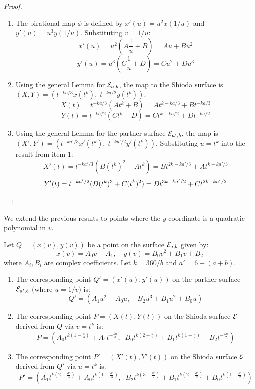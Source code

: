 \documentclass[11pt]{amsart}
\begin{document}
\begin{proof}
	\begin{enumerate}
	\item[(i)] The birational map $\phi$ is defined by $x'(u) = u^2 x(1/u)$ and $y'(u) = u^3 y(1/u)$. Substituting $v=1/u$:
	\[ x'(u) = u^2 \left( A \frac{1}{u} + B \right) = Au + Bu^2 \]
	\[ y'(u) = u^3 \left( C \frac{1}{u} + D \right) = Cu^2 + Du^3 \]
	
	\item[(ii)] Using the general Lemma for ${\mathcal E}_{a,b}$, the map to the Shioda surface is $(X, Y) = (t^{-ka/3}x(t^k), \; t^{-ka/2}y(t^k))$.
	\[ X(t) = t^{-ka/3} (A t^k + B) = A t^{k - ka/3} + B t^{-ka/3} \]
	\[ Y(t) = t^{-ka/2} (C t^k + D) = C t^{k - ka/2} + D t^{-ka/2} \]
	
\item[(iii)] Using the general Lemma for the partner surface ${\mathcal E}_{a',b}$, the map is $(X', Y') = (t^{-ka'/3}x'(t^k), \; t^{-ka'/2}y'(t^k))$.
	Substituting $u=t^k$ into the result from item 1:
	\[ X'(t) = t^{-ka'/3} (B (t^k)^2 + A t^k) = B t^{2k - ka'/3} + A t^{k - ka'/3} \]
	\[ Y'(t) = t^{-ka'/2} (D (t^k)^3 + C (t^k)^2) = D t^{3k - ka'/2} + C t^{2k - ka'/2} \qedhere \]
\end{enumerate}
\end{proof}

We extend the previous results to points where the $y$-coordinate is a quadratic polynomial in $v$.

\begin{lema}
	\label{lem:quadratic_transform}
	Let $Q = (x(v), y(v))$ be a point on the surface ${\mathcal E}_{a,b}$ given by:
	\[ x(v) = A_0 v + A_1, \quad y(v) = B_0 v^2 + B_1 v + B_2 \]
	where $A_i, B_i$ are complex coefficients. Let $k = 360/b$ and $a' = 6-(a+b)$.
	
	\begin{enumerate}
		\item[(i)] The corresponding point $Q'=(x'(u), y'(u))$ on the partner surface ${\mathcal E}_{a', b}$ (where $u=1/v$) is:
		\[ Q' = (A_1 u^2 + A_0 u, \quad B_2 u^3 + B_1 u^2 + B_0 u) \]
		
		\item [(ii)] The corresponding point $P=(X(t), Y(t))$ on the Shioda surface ${\mathcal E}$ derived from $Q$ via $v=t^k$ is:
		\[ P = \left( A_0 t^{k(1 - \frac{a}{3})} + A_1 t^{-\frac{ka}{3}}, \;\; B_0 t^{k(2 - \frac{a}{2})} + B_1 t^{k(1 - \frac{a}{2})} + B_2 t^{-\frac{ka}{2}} \right) \]
		
		\item[(iii)] The corresponding point $P'=(X'(t), Y'(t))$ on the Shioda surface ${\mathcal E}$ derived from $Q'$ via $u=t^k$ is:
		\[ P' = \left( A_1 t^{k(2 - \frac{a'}{3})} + A_0 t^{k(1 - \frac{a'}{3})}, \;\; B_2 t^{k(3 - \frac{a'}{2})} + B_1 t^{k(2 - \frac{a'}{2})} + B_0 t^{k(1 - \frac{a'}{2})} \right) \]
	\end{enumerate}
\end{lema}
\end{document}
